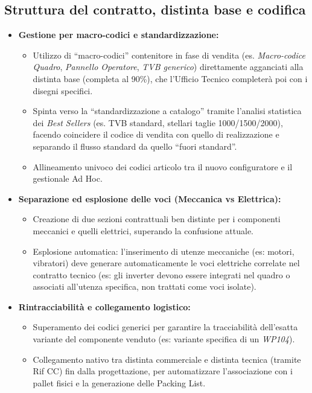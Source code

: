 \subsection{Struttura del contratto, distinta base e codifica}
\begin{itemize}
      \item \textbf{Gestione per macro-codici e standardizzazione:}
            \begin{itemize}
                  \item Utilizzo di ``macro-codici'' contenitore in fase di vendita (es. \textit{Macro-codice Quadro},
                        \textit{Pannello Operatore}, \textit{TVB generico}) direttamente agganciati alla distinta base
                        (completa al 90\%), che l'Ufficio Tecnico completerà poi con i disegni specifici.
                  \item Spinta verso la ``standardizzazione a catalogo'' tramite l'analisi statistica dei \textit{Best Sellers}
                        (es. TVB standard, stellari taglie 1000/1500/2000), facendo coincidere il codice di vendita con quello di realizzazione
                        e separando il flusso standard da quello ``fuori standard''.
                  \item Allineamento univoco dei codici articolo tra il nuovo configuratore e il gestionale Ad Hoc.
            \end{itemize}
      \item \textbf{Separazione ed esplosione delle voci (Meccanica vs Elettrica):}
            \begin{itemize}
                  \item Creazione di due sezioni contrattuali ben distinte per i componenti meccanici e quelli elettrici,
                        superando la confusione attuale.
                  \item Esplosione automatica: l'inserimento di utenze meccaniche (es: motori, vibratori) deve generare
                        automaticamente le voci elettriche correlate nel contratto tecnico (es: gli inverter devono essere integrati
                        nel quadro o associati all'utenza specifica, non trattati come voci isolate).
            \end{itemize}
      \item \textbf{Rintracciabilità e collegamento logistico:}
            \begin{itemize}
                  \item Superamento dei codici generici per garantire la tracciabilità dell'esatta variante del
                        componente venduto (es: variante specifica di un \textit{WP104}).
                  \item Collegamento nativo tra distinta commerciale e distinta tecnica (tramite Rif CC)
                        fin dalla progettazione, per automatizzare l'associazione con i pallet fisici e la generazione delle Packing List.
            \end{itemize}
\end{itemize}

